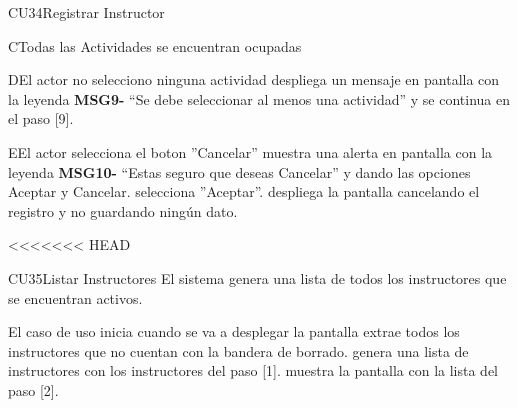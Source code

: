 \begin{UseCase}{CU34}{Registrar Instructor}
{\begin{UCtrayectoriaA}{C}{Todas las Actividades se encuentran ocupadas}
\end{UCtrayectoriaA}
\begin{UCtrayectoriaA}{D}{El actor no selecciono ninguna actividad}
		   \UCpaso despliega un mensaje en pantalla con la leyenda {\bf MSG9-} “Se debe seleccionar al menos una actividad” y se continua en el paso [9].	  
\end{UCtrayectoriaA}
\begin{UCtrayectoriaA}{E}{El actor selecciona el boton ''Cancelar''}
		   \UCpaso muestra una alerta en pantalla con la leyenda {\bf MSG10-} “Estas seguro que deseas Cancelar” y dando las opciones Aceptar y Cancelar.
		   \UCpaso[\UCactor] selecciona ''Aceptar''.
		   \UCpaso despliega la pantalla cancelando el registro y no guardando ningún dato.
\end{UCtrayectoriaA}


<<<<<<< HEAD

\begin{UseCase}{CU35}{Listar Instructores}{
		El sistema genera una lista de todos los instructores que se encuentran activos.
	}
\end{UseCase}
\begin{UCtrayectoria}{El caso de uso inicia cuando se va a desplegar la pantalla }
	\UCpaso extrae todos los instructores que no cuentan con la bandera de borrado.
	\UCpaso genera una lista de instructores con los instructores del paso [1].
	\UCpaso muestra la pantalla   con la lista del paso [2].
\end{UCtrayectoria}

}
\end{UseCase}
